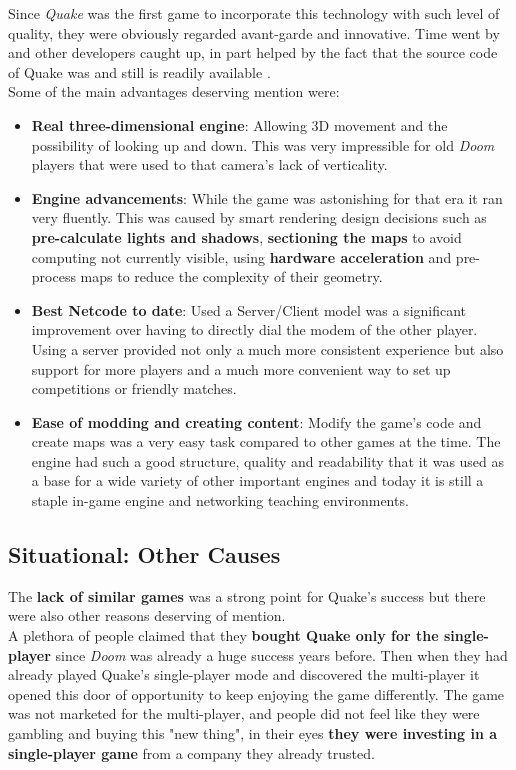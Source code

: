 Since \textit{Quake} was the first game to incorporate this technology with such level of quality, they were obviously regarded avant-garde and innovative. Time went by and other developers caught up, in part helped by the fact that the source code of Quake was and still is readily available \citep{git:id}.\\

Some of the main advantages deserving mention were:

\begin{itemize}
	\item \textbf{Real three-dimensional engine}: Allowing 3D movement and the possibility of looking up and down. This was very impressible for old \textit{Doom} players that were used to that camera's lack of verticality.
	\item \textbf{Engine advancements}: While the game was astonishing for that era it ran very fluently. This was caused by smart rendering design decisions such as \textbf{pre-calculate lights and shadows}, \textbf{sectioning the maps} to avoid computing not currently visible, using \textbf{hardware acceleration} and pre-process maps to reduce the complexity of their geometry.
	\item \textbf{Best Netcode to date}: Used a Server/Client model was a significant improvement over having to directly dial the modem of the other player. Using a server provided not only a much more consistent experience but also support for more players and a much more convenient way to set up competitions or friendly matches.
	\item \textbf{Ease of modding and creating content}: Modify the game's code and create maps was a very easy task compared to other games at the time. The engine had such a good structure, quality and readability that it was used as a base for a wide variety of other important engines and today it is still a staple in-game engine and networking teaching environments.
\end{itemize}

\subsection{Situational: Other Causes}

The \textbf{lack of similar games} was a strong point for Quake's success but there were also other reasons deserving of mention.\\

A plethora of people claimed that they \textbf{bought Quake only for the single-player} since \textit{Doom} was already a huge success years before. Then when they had already played Quake's single-player mode and discovered the multi-player it opened this door of opportunity to keep enjoying the game differently. The game was not marketed for the multi-player, and people did not feel like they were gambling and buying this "new thing", in their eyes \textbf{they were investing in a single-player game} from a company they already trusted.\\


